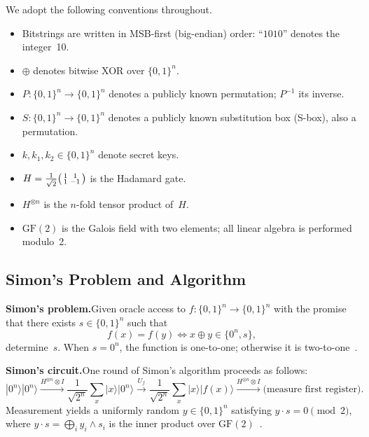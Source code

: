 \documentclass[11pt,a4paper]{article}
\begin{document}
We adopt the following conventions throughout.
\begin{itemize}
    \item Bitstrings are written in MSB-first (big-endian) order:
    ``$1010$'' denotes the integer~10.
    \item $\oplus$ denotes bitwise XOR over $\{0,1\}^n$.
    \item $P:\{0,1\}^n\to\{0,1\}^n$ denotes a publicly known
    permutation; $P^{-1}$ its inverse.
    \item $S:\{0,1\}^n\to\{0,1\}^n$ denotes a publicly known substitution
    box (S-box), also a permutation.
    \item $k, k_1, k_2 \in \{0,1\}^n$ denote secret keys.
    \item $H = \frac{1}{\sqrt{2}}\begin{psmallmatrix}1&1\\1&-1
    \end{psmallmatrix}$ is the Hadamard gate.
    \item $H^{\otimes n}$ is the $n$-fold tensor product of~$H$.
    \item $\text{GF}(2)$ is the Galois field with two elements;
    all linear algebra is performed modulo~2.
\end{itemize}

\subsection{Simon's Problem and Algorithm}

\textbf{Simon's problem.}\quad Given oracle access to
$f:\{0,1\}^n\to\{0,1\}^n$ with the promise that there exists
$s\in\{0,1\}^n$ such that
\begin{equation}\label{eq:simon_promise}
    f(x) = f(y) \iff x \oplus y \in \{0^n, s\},
\end{equation}
determine~$s$.  When $s=0^n$, the function is one-to-one; otherwise it
is two-to-one~\cite{Simon1997}.

\textbf{Simon's circuit.}\quad One round of Simon's algorithm proceeds
as follows:
\begin{equation}\label{eq:simon_circuit}
    |0^n\rangle|0^n\rangle
    \xrightarrow{H^{\otimes n}\otimes I}
    \frac{1}{\sqrt{2^n}}\sum_{x}|x\rangle|0^n\rangle
    \xrightarrow{U_f}
    \frac{1}{\sqrt{2^n}}\sum_{x}|x\rangle|f(x)\rangle
    \xrightarrow{H^{\otimes n}\otimes I}
    \text{(measure first register)}.
\end{equation}
Measurement yields a uniformly random $y\in\{0,1\}^n$ satisfying
$y\cdot s = 0 \pmod{2}$, where $y\cdot s = \bigoplus_{i} y_i \wedge
s_i$ is the inner product over $\text{GF}(2)$~\cite{NielsenChuang2010}.
\end{document}

